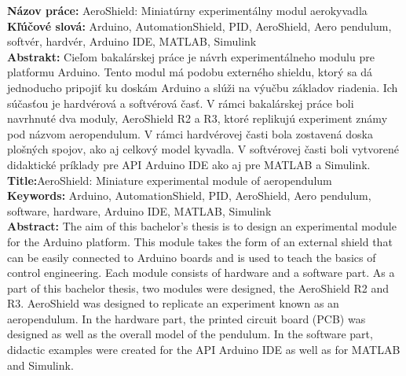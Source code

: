 \noindent
\textbf{Názov práce:} AeroShield: Miniatúrny experimentálny modul aerokyvadla\\
\textbf{Kľúčové slová: } Arduino, AutomationShield, PID, AeroShield, Aero pendulum, softvér, hardvér, Arduino IDE, MATLAB, Simulink \\
\textbf{Abstrakt: } Cieľom bakalárskej práce je návrh experimentálneho modulu pre platformu Arduino. Tento modul má podobu externého shieldu, ktorý sa dá jednoducho pripojiť ku doskám Arduino a slúži na výučbu základov riadenia. Ich súčasťou je hardvérová a softvérová časť. V rámci bakalárskej práce boli navrhnuté dva moduly, AeroShield R2 a R3, ktoré replikujú experiment známy pod názvom aeropendulum. V rámci hardvérovej časti bola zostavená doska plošných spojov, ako aj celkový model kyvadla. V softvérovej časti boli vytvorené didaktické príklady pre API Arduino IDE ako aj pre MATLAB a Simulink.\\

\noindent
\textbf{Title:}AeroShield: Miniature experimental module of aeropendulum \\
\textbf{Keywords: }  Arduino, AutomationShield, PID, AeroShield, Aero pendulum, software, hardware, Arduino IDE, MATLAB, Simulink\\
\textbf{Abstract: } The aim of this bachelor's thesis is to design an experimental module for the Arduino platform. This module takes the form of an external shield that can be easily connected to Arduino boards and is used to teach the basics of control engineering. Each module consists of hardware and a software part. As a part of this bachelor thesis, two modules were designed, the AeroShield R2 and R3. AeroShield was designed to replicate an experiment known as an aeropendulum. In the hardware part, the printed circuit board (PCB) was designed as well as the overall model of the pendulum. In the software part, didactic examples were created for the API Arduino IDE as well as for MATLAB and Simulink.
\cleardoublepage
